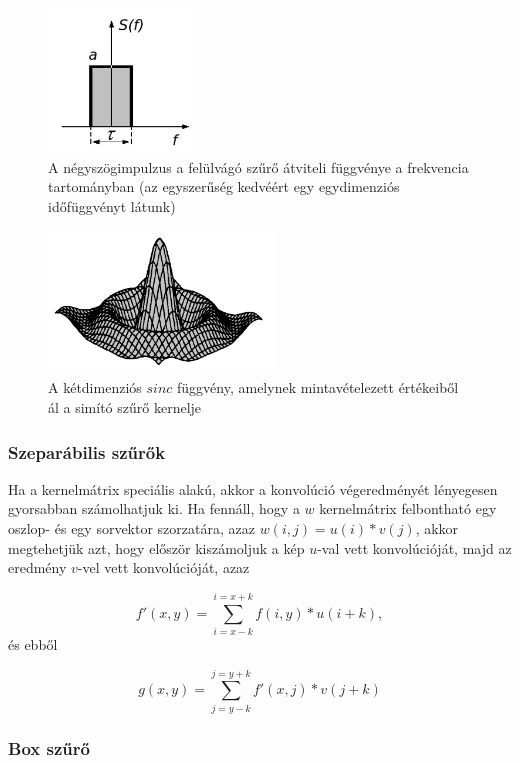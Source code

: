 \documentclass[a4paper,12pt]{article}
\begin{document}
\begin{figure}
	\centering
	\includegraphics[width=4cm]{negyszogfv.png}
	\caption{A négyszögimpulzus a felülvágó szűrő átviteli függvénye a frekvencia
		tartományban (az egyszerűség kedvéért egy egydimenziós időfüggvényt látunk)}
	\label{fig:negyszogfv}
\end{figure}

\begin{figure}
	\centering
	\includegraphics[width=6cm]{sincfv_2d.png}
	\caption{A kétdimenziós $sinc$ függvény, amelynek mintavételezett értékeiből ál	a simító szűrő kernelje}
	\label{fig:sincfv2D}
\end{figure}



\subsubsection{Szeparábilis szűrők}

Ha a kernelmátrix speciális alakú, akkor a konvolúció végeredményét lényegesen
gyorsabban számolhatjuk ki. Ha fennáll, hogy a $w$ kernelmátrix felbontható egy
oszlop- és egy sorvektor szorzatára, azaz $w(i,j)=u(i)\ast v(j)$, akkor
megtehetjük azt, hogy először kiszámoljuk a kép $u$-val vett konvolúcióját, majd
az eredmény $v$-vel vett konvolúcióját, azaz

$$f'(x,y)=\sum_{i=x-k}^{i=x+k}f(i,y) \ast u(i+k),$$ és ebből

$$ g(x,y)=\sum_{j=y-k}^{j=y+k}f'(x,j) \ast v(j+k)$$


\subsubsection{Box szűrő}
\end{document}
